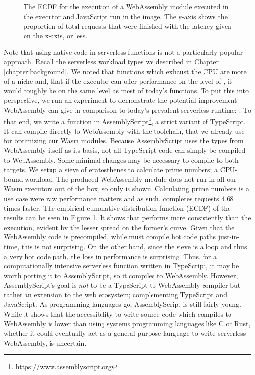 \begin{figure}
    \begin{center}
        
    \end{center}
    \caption{The ECDF for the execution of a WebAssembly module executed in the  executor and JavaScript run in the  image. The y-axis shows the proportion of total requests that were finished with the latency given on the x-axis, or less.}
    \label{fig:pc-load-prime}
\end{figure}

Note that using native code in serverless functions is not a particularly popular approach. Recall the serverless workload types we described in Chapter \ref{chapter:background}. We noted that functions which exhaust the CPU are more of a niche and, that if the executor can offer performance on the level of , it would roughly be on the same level as most of today's functions.
To put this into perspective, we run an experiment to demonstrate the potential improvement WebAssembly can give in comparison to today's prevalent serverless runtime: .
To that end, we write a function in AssemblyScript\footnote{\url{https://www.assemblyscript.org}}, a strict variant of TypeScript. It can compile directly to WebAssembly with the  toolchain, that we already use for optimizing our Wasm modules. Because AssemblyScript uses the types from WebAssembly itself as its basis, not all TypeScript code can simply be compiled to WebAssembly. Some minimal changes may be necessary to compile to both targets. We setup a sieve of eratosthenes to calculate prime numbers; a CPU-bound workload. The produced WebAssembly module does not run in all our Wasm executors out of the box, so only  is shown. Calculating prime numbers is a use case were raw performance matters and as such,  completes requests 4.68 times faster. The empirical cumulative distribution function (ECDF) of the results can be seen in Figure \ref{fig:pc-load-prime}. It shows that  performs more consistently than the  execution, evident by the lesser spread on the former's curve. Given that the WebAssembly code is precompiled, while  must compile hot code paths just-in-time, this is not surprising. On the other hand, since the sieve is a loop and thus a very hot code path, the loss in performance is surprising.
Thus, for a computationally intensive serverless function written in TypeScript, it may be worth porting it to AssemblyScript, so it compiles to WebAssembly. However, AssemblyScript's goal is \emph{not} to be a TypeScript to WebAssembly compiler but rather an extension to the web ecosystem; complementing TypeScript and JavaScript. As programming languages go, AssemblyScript is still fairly young. While it shows that the accessibility to write source code which compiles to WebAssembly is lower than using systems programming languages like C or Rust, whether it could eventually act as a general purpose language to write serverless WebAssembly, is uncertain.

